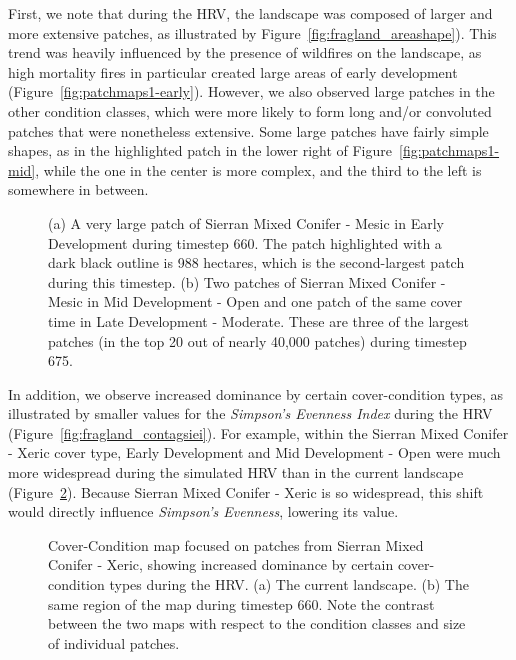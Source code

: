First, we note that during the HRV, the landscape was composed of larger and more extensive patches, as illustrated by Figure~\ref{fig:fragland_areashape}). This trend was heavily influenced by the presence of wildfires on the landscape, as high mortality fires in particular created large areas of early development (Figure~\ref{fig:patchmaps1-early}). However, we also observed large patches in the other condition classes, which were more likely to form long and/or convoluted patches that were nonetheless extensive. Some large patches have fairly simple shapes, as in the highlighted patch in the lower right of Figure~\ref{fig:patchmaps1-mid}, while the one in the center is more complex, and the third to the left is somewhere in between.
\begin{figure}[!htbp]
  \centering
  \caption{(a) A very large patch of Sierran Mixed Conifer - Mesic in Early Development during timestep 660. The patch highlighted with a dark black outline is 988 hectares, which is the second-largest patch during this timestep. (b) Two patches of Sierran Mixed Conifer - Mesic in Mid Development - Open and one patch of the same cover time in Late Development - Moderate. These are three of the largest patches (in the top 20 out of nearly 40,000 patches) during timestep 675.} 
  \label{fig:patchmaps1}
\end{figure}

In addition, we observe increased dominance by certain cover-condition types, as illustrated by smaller values for the \emph{Simpson's Evenness Index} during the HRV (Figure~\ref{fig:fragland_contagsiei}). For example, within the Sierran Mixed Conifer - Xeric cover type, Early Development and Mid Development - Open were much more widespread during the simulated HRV than in the current landscape (Figure~\ref{fig:patchmaps2}). Because Sierran Mixed Conifer - Xeric is so widespread, this shift would directly influence \emph{Simpson's Evenness}, lowering its value.
\begin{figure}[!htbp]
  \centering
  \caption{Cover-Condition map focused on patches from Sierran Mixed Conifer - Xeric, showing increased dominance by certain cover-condition types during the HRV. (a) The current landscape. (b) The same region of the map during timestep 660. Note the contrast between the two maps with respect to the condition classes and size of individual patches.} 
  \label{fig:patchmaps2}
\end{figure}


